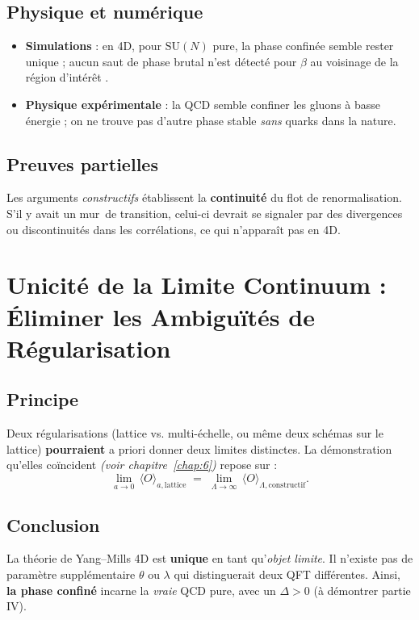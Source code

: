 \subsection*{Physique et numérique}
\begin{itemize}
	\item \textbf{Simulations} : en 4D, pour \(\mathrm{SU}(N)\) pure, la phase confinée semble rester unique ; aucun saut de phase brutal n’est détecté pour \(\beta\) au voisinage de la région d’intérêt \cite{Creutz1983}.  
	\item \textbf{Physique expérimentale} : la QCD semble confiner les gluons à basse énergie ; on ne trouve pas d’autre phase stable \emph{sans} quarks dans la nature.
\end{itemize}

\subsection*{Preuves partielles}
Les arguments \emph{constructifs} établissent la \textbf{continuité} du flot de renormalisation. S’il y avait un \og mur\fg\ de transition, celui-ci devrait se signaler par des divergences ou discontinuités dans les corrélations, ce qui n’apparaît pas en 4D.

\vspace{1em}

\section{Unicité de la Limite Continuum : Éliminer les Ambiguïtés de Régularisation}
\label{sec:7.4}

\subsection*{Principe}
Deux régularisations (lattice vs. multi-échelle, ou même deux schémas sur le lattice) \textbf{pourraient} a priori donner deux limites distinctes. La démonstration qu’elles coïncident \emph{(voir chapitre~\ref{chap:6})} repose sur :
\[
\lim_{a \to 0} \,\langle O\rangle_{a,\mathrm{lattice}} \;=\;
\lim_{\Lambda \to \infty}\,\langle O\rangle_{\Lambda,\mathrm{constructif}}.
\]

\subsection*{Conclusion}
La théorie de Yang--Mills 4D est \textbf{unique} en tant qu’\emph{objet limite}. Il n’existe pas de paramètre supplémentaire \(\theta\) ou \(\lambda\) qui distinguerait deux QFT différentes. Ainsi, \textbf{la phase confiné} incarne la \emph{vraie} QCD pure, avec un \(\Delta>0\) (à démontrer partie IV).

